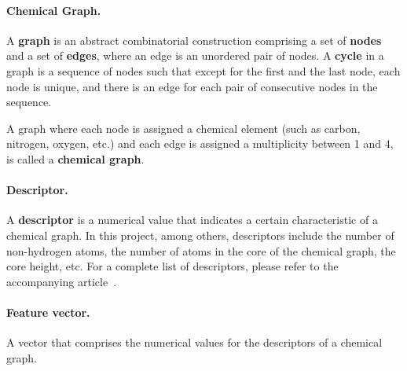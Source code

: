 \documentclass[11pt, titlepage, dvipdfmx, twoside]{article}
\begin{document}
\paragraph{Chemical Graph.}
A {\bf graph} is an abstract combinatorial construction
comprising a set of {\bf nodes} and a set of {\bf edges},
where an edge is an unordered pair of nodes.
A {\bf cycle} in a graph is a sequence of
nodes such that except for the first and the last node,
each node is unique, and there is an edge for each pair of consecutive 
nodes in the sequence.

A graph where each node is assigned a chemical element
(such as carbon, nitrogen, oxygen, etc.) and each
edge is assigned a multiplicity between 1 and 4,
is called a {\bf chemical graph}.


\paragraph{Descriptor.}
A {\bf descriptor} is a numerical value that 
indicates a certain characteristic of a chemical graph.
In this project, among others, descriptors include
the number of non-hydrogen atoms, the number of atoms in the core of the 
chemical graph, the core height, etc.
For a complete list of descriptors, please refer to the 
accompanying article~\cite{BH_cyclic_arxiv}.


\paragraph{Feature vector.}
A vector that comprises the numerical values for
the descriptors of a chemical graph.
\end{document}
